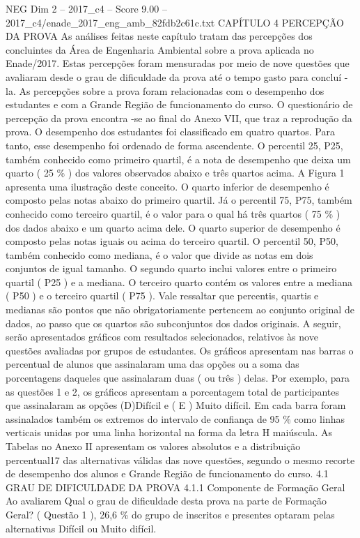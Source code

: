 \begin{textsample}{NEG Dim 2 – 2017\_c4 – Score 9.00 – 2017\_c4/enade\_2017\_eng\_amb\_82fdb2c61c.txt}  \label{ex:f2_neg_336}
CAPÍTULO 4 PERCEPÇÃO DA PROVA As análises feitas neste capítulo tratam das percepções dos concluintes da Área de Engenharia Ambiental sobre a prova aplicada no Enade/2017.
Estas percepções foram mensuradas por meio de nove questões que avaliaram desde o grau de dificuldade da prova até o tempo gasto para concluí -la.
As percepções sobre a prova foram relacionadas com o desempenho dos estudantes e com a Grande Região de funcionamento do curso.
O questionário de percepção da prova encontra -se ao final do Anexo VII, que traz a reprodução da prova.
O desempenho dos estudantes foi classificado em quatro quartos.
Para tanto, esse desempenho foi ordenado de forma ascendente.
O percentil 25, P25, também conhecido como primeiro quartil, é a nota de desempenho que deixa um quarto ( 25 \% ) dos valores observados abaixo e três quartos acima.
A Figura 1 apresenta uma ilustração deste conceito.
O quarto inferior de desempenho é composto pelas notas abaixo do primeiro quartil.
Já o percentil 75, P75, também conhecido como terceiro quartil, é o valor para o qual há três quartos ( 75 \% ) dos dados abaixo e um quarto acima dele.
O quarto superior de desempenho é composto pelas notas iguais ou acima do terceiro quartil.
O percentil 50, P50, também conhecido como mediana, é o valor que divide as notas em dois conjuntos de igual tamanho.
O segundo quarto inclui valores entre o primeiro quartil ( P25 ) e a mediana.
O terceiro quarto contém os valores entre a mediana ( P50 ) e o terceiro quartil ( P75 ).
Vale ressaltar que percentis, quartis e medianas são pontos que não obrigatoriamente pertencem ao conjunto original de dados, ao passo que os quartos são subconjuntos dos dados originais.
A seguir, serão apresentados gráficos com resultados selecionados, relativos às nove questões avaliadas por grupos de estudantes.
Os gráficos apresentam nas barras o percentual de alunos que assinalaram uma das opções ou a soma das porcentagens daqueles que assinalaram duas ( ou três ) delas.
Por exemplo, para as questões 1 e 2, os gráficos apresentam a porcentagem total de participantes que assinalaram as opções (D)Difícil e ( E ) Muito difícil.
Em cada barra foram assinalados também os extremos do intervalo de confiança de 95 \% como linhas verticais unidas por uma linha horizontal na forma da letra H maiúscula.
As Tabelas no Anexo II apresentam os valores absolutos e a distribuição percentual17 das alternativas válidas das nove questões, segundo o mesmo recorte de desempenho dos alunos e Grande Região de funcionamento do curso. 4.1 GRAU DE DIFICULDADE DA PROVA 4.1.1 Componente de Formação Geral Ao avaliarem Qual o grau de dificuldade desta prova na parte de Formação Geral? ( Questão 1 ), 26,6 \% do grupo de inscritos e presentes optaram pelas alternativas Difícil ou Muito difícil.

\end{textsample}
